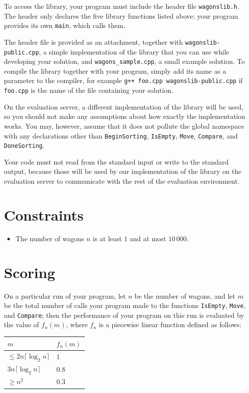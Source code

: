 To access the library, your program must include the header file
\texttt{wagonslib.h}. The header only declares the five library functions listed
above; your program provides its own \texttt{main}, which calls them.

The header file is provided as an attachment, together with
\texttt{wagonslib-public.cpp}, a simple implementation of the library that you
can use while developing your solution, and \texttt{wagons\_sample.cpp}, a small
example solution. To compile the library together with your program, simply add
its name as a parameter to the compiler, for example
\texttt{g++ foo.cpp wagonslib-public.cpp} if \texttt{foo.cpp} is the name of the
file containing your solution.

On the evaluation server, a different implementation of the library will be
used, so you should not make any assumptions about how exactly the
implementation works. You may, however, assume that it does not pollute the
global namespace with any declarations other than \texttt{BeginSorting},
\texttt{IsEmpty}, \texttt{Move}, \texttt{Compare}, and \texttt{DoneSorting}.

Your code must not read from the standard input or write to the standard output,
because those will be used by our implementation of the library on the
evaluation server to communicate with the rest of the evaluation environment.

\section*{Constraints}
\begin{itemize}
  \item The number of wagons $n$ is at least $1$ and at most $10\,000$.
\end{itemize}

\section*{Scoring}
On a particular run of your program, let $n$ be the number of wagons, and let $m$
be the total number of calls your program made to the functions
\texttt{IsEmpty}, \texttt{Move}, and \texttt{Compare}; then the performance of
your program on this run is evaluated by the value of $f_n(m)$, where $f_n$ is a
piecewise linear function defined as follows:

\noindent
\begin{tabular}{| l | l |}
  \hline
  $m$ & $f_n(m)$ \\ \hline
  $\leq 2n\lceil \log_2 n \rceil$ & $1$ \\ \hline
  $3n\lceil \log_2 n \rceil$ & $0.8$ \\ \hline
  $\geq n^2$ & $0.3$ \\ \hline
\end{tabular}

